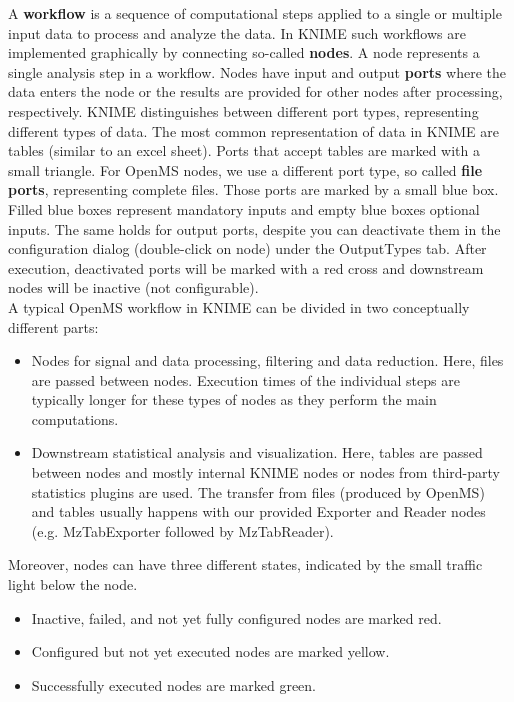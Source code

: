 A \textbf{workflow} is a sequence of computational steps applied to a single or multiple input data to process and analyze the data.
In KNIME such workflows are implemented graphically by connecting so-called \textbf{nodes}.
A node represents a single analysis step in a workflow.
Nodes have input and output \textbf{ports} where the data enters the node or the results are provided for other nodes after processing, respectively.
KNIME distinguishes between different port types, representing different types of data.
The most common representation of data in KNIME are tables (similar to an excel sheet).
Ports that accept tables are marked with a small triangle.
For OpenMS nodes, we use a different port type, so called \textbf{file ports}, representing complete files.
Those ports are marked by a small blue box.
Filled blue boxes represent mandatory inputs and empty blue boxes optional inputs. The same holds for output ports, despite you can deactivate them
in the configuration dialog (double-click on node) under the OutputTypes tab. After execution, deactivated ports will be marked with a red cross and downstream nodes
will be inactive (not configurable).\\
A typical OpenMS workflow in KNIME can be divided in two conceptually different parts:
\begin{itemize}
\item
Nodes for signal and data processing, filtering and data reduction. Here, files are passed between nodes. Execution times of the individual steps are typically longer for these types of nodes as they perform the main computations. 
\item
Downstream statistical analysis and visualization. Here, tables are passed between nodes and mostly internal KNIME nodes or nodes from third-party statistics plugins are used. The transfer from files (produced by OpenMS) and tables usually happens with our provided Exporter and Reader nodes (e.g. MzTabExporter followed by MzTabReader).
\end{itemize}
Moreover, nodes can have three different states, indicated by the small traffic light below the node.

\begin{itemize}
\item
Inactive, failed, and not yet fully configured nodes are marked red.
\item
Configured but not yet executed nodes are marked yellow.
\item
Successfully executed nodes are marked green.
\end{itemize}

